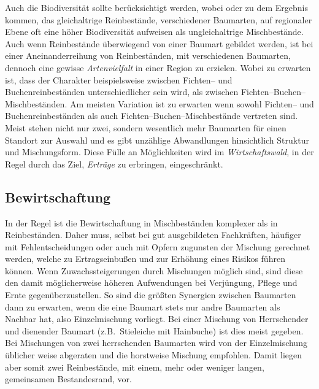 \documentclass[twocolumn]{scrartcl}
\begin{document}
Auch die Biodiversität sollte berücksichtigt werden, wobei
\cite{heinrichs2019Reinbestand} oder \cite{schall2017Reinbestand} zu
dem Ergebnis kommen, das gleichaltrige Reinbestände, verschiedener
Baumarten, auf regionaler Ebene oft eine höher Biodiversität aufweisen
als ungleichaltrige Mischbestände.  Auch wenn Reinbestände überwiegend
von einer Baumart gebildet werden, ist bei einer Aneinanderreihung von
Reinbeständen, mit verschiedenen Baumarten, dennoch eine gewisse
\emph{Artenvielfalt} in einer Region zu erzielen. Wobei zu erwarten
ist, dass der Charakter beispielsweise zwischen Fichten-- und
Buchenreinbeständen unterschiedlicher sein wird, als zwischen
Fichten--Buchen--Mischbeständen. Am meisten Variation ist zu erwarten
wenn sowohl Fichten-- und Buchenreinbeständen als auch
Fichten--Buchen--Mischbestände vertreten sind. Meist stehen nicht nur
zwei, sondern wesentlich mehr Baumarten für einen Standort zur Auswahl
und es gibt unzählige Abwandlungen hinsichtlich Struktur und
Mischungsform. Diese Fülle an Möglichkeiten wird im
\emph{Wirtschaftswald}, in der Regel durch das Ziel, \emph{Erträge} zu
erbringen, eingeschränkt.

\subsection{Bewirtschaftung}
\label{ssec:bewirtschaftung}

In der Regel ist die Bewirtschaftung in Mischbeständen komplexer als
in Reinbeständen.  Daher muss, selbst bei gut ausgebildeten
Fachkräften, häufiger mit Fehlentscheidungen oder auch mit Opfern
zugunsten der Mischung gerechnet werden, welche zu Ertragseinbußen und
zur Erhöhung eines Risikos führen können. Wenn Zuwachssteigerungen
durch Mischungen möglich sind, sind diese den damit möglicherweise
höheren Aufwendungen bei Verjüngung, Pflege und Ernte
gegenüberzustellen. So sind die größten Synergien zwischen Baumarten
dann zu erwarten, wenn die eine Baumart stets nur andre Baumarten als
Nachbar hat, also Einzelmischung vorliegt. Bei einer Mischung von
Herrschender und dienender Baumart (z.B.\ Stieleiche mit Hainbuche)
ist dies meist gegeben. Bei Mischungen von zwei herrschenden Baumarten
wird von der Einzelmischung üblicher weise abgeraten und die
horstweise Mischung empfohlen. Damit liegen aber somit zwei
Reinbestände, mit einem, mehr oder weniger langen, gemeinsamen
Bestandesrand, vor.
\end{document}
